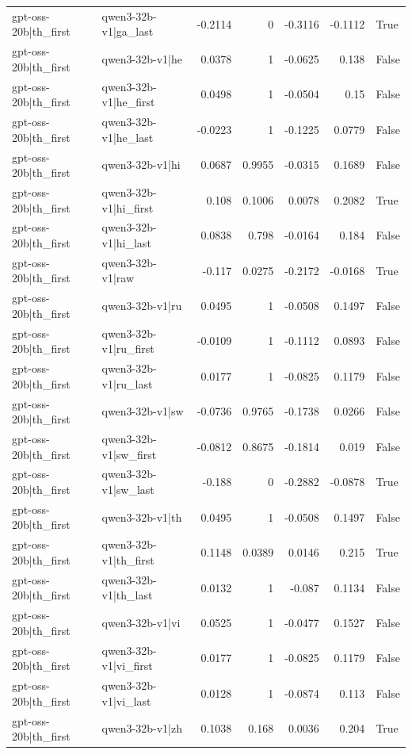 \begin{table}
\begin{tabular}{l l r r r r l}
gpt-oss-20b|th_first & qwen3-32b-v1|ga_last & -0.2114 & 0 & -0.3116 & -0.1112 & True \\
gpt-oss-20b|th_first & qwen3-32b-v1|he & 0.0378 & 1 & -0.0625 & 0.138 & False \\
gpt-oss-20b|th_first & qwen3-32b-v1|he_first & 0.0498 & 1 & -0.0504 & 0.15 & False \\
gpt-oss-20b|th_first & qwen3-32b-v1|he_last & -0.0223 & 1 & -0.1225 & 0.0779 & False \\
gpt-oss-20b|th_first & qwen3-32b-v1|hi & 0.0687 & 0.9955 & -0.0315 & 0.1689 & False \\
gpt-oss-20b|th_first & qwen3-32b-v1|hi_first & 0.108 & 0.1006 & 0.0078 & 0.2082 & True \\
gpt-oss-20b|th_first & qwen3-32b-v1|hi_last & 0.0838 & 0.798 & -0.0164 & 0.184 & False \\
gpt-oss-20b|th_first & qwen3-32b-v1|raw & -0.117 & 0.0275 & -0.2172 & -0.0168 & True \\
gpt-oss-20b|th_first & qwen3-32b-v1|ru & 0.0495 & 1 & -0.0508 & 0.1497 & False \\
gpt-oss-20b|th_first & qwen3-32b-v1|ru_first & -0.0109 & 1 & -0.1112 & 0.0893 & False \\
gpt-oss-20b|th_first & qwen3-32b-v1|ru_last & 0.0177 & 1 & -0.0825 & 0.1179 & False \\
gpt-oss-20b|th_first & qwen3-32b-v1|sw & -0.0736 & 0.9765 & -0.1738 & 0.0266 & False \\
gpt-oss-20b|th_first & qwen3-32b-v1|sw_first & -0.0812 & 0.8675 & -0.1814 & 0.019 & False \\
gpt-oss-20b|th_first & qwen3-32b-v1|sw_last & -0.188 & 0 & -0.2882 & -0.0878 & True \\
gpt-oss-20b|th_first & qwen3-32b-v1|th & 0.0495 & 1 & -0.0508 & 0.1497 & False \\
gpt-oss-20b|th_first & qwen3-32b-v1|th_first & 0.1148 & 0.0389 & 0.0146 & 0.215 & True \\
gpt-oss-20b|th_first & qwen3-32b-v1|th_last & 0.0132 & 1 & -0.087 & 0.1134 & False \\
gpt-oss-20b|th_first & qwen3-32b-v1|vi & 0.0525 & 1 & -0.0477 & 0.1527 & False \\
gpt-oss-20b|th_first & qwen3-32b-v1|vi_first & 0.0177 & 1 & -0.0825 & 0.1179 & False \\
gpt-oss-20b|th_first & qwen3-32b-v1|vi_last & 0.0128 & 1 & -0.0874 & 0.113 & False \\
gpt-oss-20b|th_first & qwen3-32b-v1|zh & 0.1038 & 0.168 & 0.0036 & 0.204 & True \\

\end{tabular}
\end{table}
